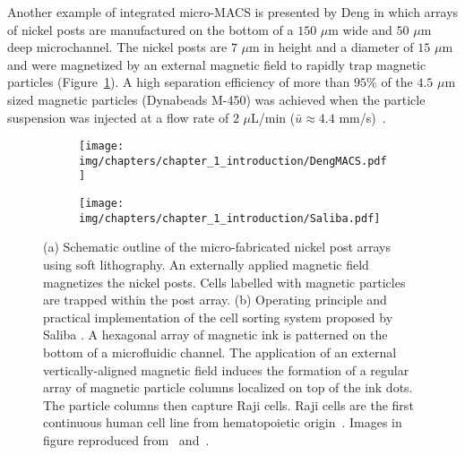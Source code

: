 Another example of integrated micro-MACS is presented by Deng \etal{} in which arrays of nickel posts are manufactured on the bottom of a $150$ $\mu$m wide and $50$ $\mu$m deep microchannel. The nickel posts are $7$ $\mu$m in height and a diameter of $15$ $\mu$m and were magnetized by an external magnetic field to rapidly trap magnetic particles (Figure~\ref{fig:Deng2002}). A high separation efficiency of more than $95\%$ of the $4.5$ $\mu$m sized magnetic particles (Dynabeads M-450) was achieved when the particle suspension was injected at a flow rate of $2$ $\mu$L/min ($\bar{u}\approx4.4$ mm/s)~\cite{Deng2002}. 

\begin{figure}[htb]
        \begin{subfigure}[b]{0.42\textwidth}
                \texttt{[image: img/chapters/chapter\_1\_introduction/DengMACS.pdf]}
                \caption{}  
                \label{fig:Deng2002}
        \end{subfigure}
        \hfill
        \begin{subfigure}[b]{0.55\textwidth}
                \texttt{[image: img/chapters/chapter\_1\_introduction/Saliba.pdf]}
                \caption{}    
                \label{fig:Saliba2010}
        \end{subfigure}
        \caption[Examples of $\mu$-MACS integrated on a LOC or $\mu$TAS]{(a) Schematic outline of the micro-fabricated nickel post arrays using soft lithography. An externally applied magnetic field magnetizes the nickel posts. Cells labelled with magnetic particles are trapped within the post array. (b) Operating principle and practical implementation of the cell sorting system proposed by Saliba \etal{}. A hexagonal array of magnetic ink is patterned on the bottom of a microfluidic channel. The application of an external vertically-aligned magnetic field induces the formation of a regular array of magnetic particle columns localized on top of the ink dots. The particle columns then capture Raji cells. Raji cells are the first continuous human cell line from hematopoietic origin~\cite{Karpova2005}. Images in figure reproduced from~\cite{Deng2002} and~\cite{Saliba2010}.}
        \label{fig:microMacs}
\end{figure}


